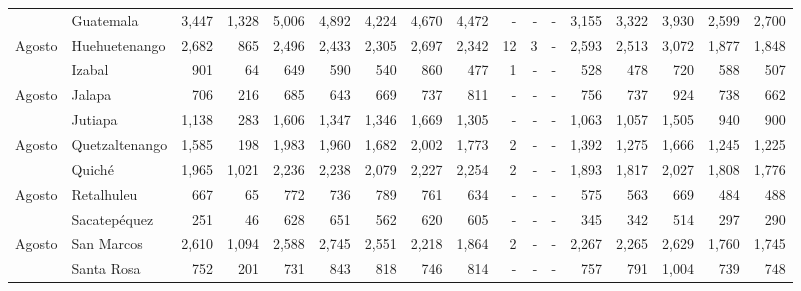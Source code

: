\begin{landscape}
\begin{center}
\begin{longtable}{llrrrrrrrrrrrrrrr}
			\rowcolor{color1!5!white}\multicolumn{1}{l}{	\footnotesize	 Agosto 	}&	 Guatemala 	&	 3,447 	&	 1,328 	&	 5,006 	&	 4,892 	&	 4,224 	&	 4,670 	&	 4,472 	&	 -   	&	 -   	&	 -   	&	 3,155 	&	 3,322 	&	 3,930 	&	 2,599 	&	 2,700 	\\
			\multicolumn{1}{l}{	\footnotesize	 Agosto 	}&	 Huehuetenango 	&	 2,682 	&	 865 	&	 2,496 	&	 2,433 	&	 2,305 	&	 2,697 	&	 2,342 	&	 12 	&	 3 	&	 -   	&	 2,593 	&	 2,513 	&	 3,072 	&	 1,877 	&	 1,848 	\\
			\rowcolor{color1!5!white}\multicolumn{1}{l}{	\footnotesize	 Agosto 	}&	 Izabal 	&	 901 	&	 64 	&	 649 	&	 590 	&	 540 	&	 860 	&	 477 	&	 1 	&	 -   	&	 -   	&	 528 	&	 478 	&	 720 	&	 588 	&	 507 	\\
			\multicolumn{1}{l}{	\footnotesize	 Agosto 	}&	 Jalapa 	&	 706 	&	 216 	&	 685 	&	 643 	&	 669 	&	 737 	&	 811 	&	 -   	&	 -   	&	 -   	&	 756 	&	 737 	&	 924 	&	 738 	&	 662 	\\
			\rowcolor{color1!5!white}\multicolumn{1}{l}{	\footnotesize	 Agosto 	}&	 Jutiapa 	&	 1,138 	&	 283 	&	 1,606 	&	 1,347 	&	 1,346 	&	 1,669 	&	 1,305 	&	 -   	&	 -   	&	 -   	&	 1,063 	&	 1,057 	&	 1,505 	&	 940 	&	 900 	\\
			\multicolumn{1}{l}{	\footnotesize	 Agosto 	}&	 Quetzaltenango 	&	 1,585 	&	 198 	&	 1,983 	&	 1,960 	&	 1,682 	&	 2,002 	&	 1,773 	&	 2 	&	 -   	&	 -   	&	 1,392 	&	 1,275 	&	 1,666 	&	 1,245 	&	 1,225 	\\
			\rowcolor{color1!5!white}\multicolumn{1}{l}{	\footnotesize	 Agosto 	}&	 Quiché 	&	 1,965 	&	 1,021 	&	 2,236 	&	 2,238 	&	 2,079 	&	 2,227 	&	 2,254 	&	 2 	&	 -   	&	 -   	&	 1,893 	&	 1,817 	&	 2,027 	&	 1,808 	&	 1,776 	\\
			\multicolumn{1}{l}{	\footnotesize	 Agosto 	}&	 Retalhuleu 	&	 667 	&	 65 	&	 772 	&	 736 	&	 789 	&	 761 	&	 634 	&	 -   	&	 -   	&	 -   	&	 575 	&	 563 	&	 669 	&	 484 	&	 488 	\\
			\rowcolor{color1!5!white}\multicolumn{1}{l}{	\footnotesize	 Agosto 	}&	 Sacatepéquez 	&	 251 	&	 46 	&	 628 	&	 651 	&	 562 	&	 620 	&	 605 	&	 -   	&	 -   	&	 -   	&	 345 	&	 342 	&	 514 	&	 297 	&	 290 	\\
			\multicolumn{1}{l}{	\footnotesize	 Agosto 	}&	 San Marcos 	&	 2,610 	&	 1,094 	&	 2,588 	&	 2,745 	&	 2,551 	&	 2,218 	&	 1,864 	&	 2 	&	 -   	&	 -   	&	 2,267 	&	 2,265 	&	 2,629 	&	 1,760 	&	 1,745 	\\
			\rowcolor{color1!5!white}\multicolumn{1}{l}{	\footnotesize	 Agosto 	}&	 Santa Rosa 	&	 752 	&	 201 	&	 731 	&	 843 	&	 818 	&	 746 	&	 814 	&	 -   	&	 -   	&	 -   	&	 757 	&	 791 	&	 1,004 	&	 739 	&	 748 	\\

\end{longtable}
\end{center}
\end{landscape}
